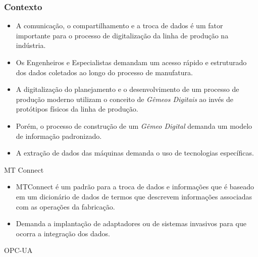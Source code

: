 \documentclass[aspectratio=169]{beamer}
\begin{document}
{\begin{frame}
\end{frame}


\begin{frame}
  \frametitle{Contexto}
  \begin{itemize}
    \item A comunicação, o compartilhamento e a troca de dados é um fator 
          importante para o processo de digitalização da linha de produção 
          na indústria.
    \item Os Engenheiros e Especialistas demandam um acesso r\'apido 
          e estruturado dos dados coletados ao longo do processo de 
          manufatura.
    \item A digitaliza\c c\~ao do planejamento e o desenvolvimento de um 
          processo de produ\c c\~ao moderno utilizam o conceito de 
          \emph{Gêmeos Digitais} ao inv\'es de prot\'otipos f\'isicos da 
          linha de produ\c c\~ao.
    \item Porém, o processo de constru\c c\~ao de um \emph{Gêmeo Digital} 
          demanda um modelo de informa\c c\~ao padronizado.
    \item A extra\c c\~ao de dados das m\'aquinas demanda o uso 
          de tecnologias espec\'ificas. 
  \end{itemize}  

\end{frame}


\begin{frame}{MT Connect}

  \begin{itemize}

    \item {
      MTConnect \'e um padr\~ao para a troca de dados e informa\c c\~oes 
      que \'e baseado em um dicion\'ario de dados de termos que descrevem 
      informa\c c\~oes associadas com as opera\c c\~oes da fabrica\c c\~ao.
    }

    \item {
      Demanda a implanta\c c\~ao de adaptadores ou de sistemas 
      invasivos para que ocorra a integra\c c\~ao dos dados.      
    }   

  \end{itemize}   

\end{frame}


\begin{frame}{OPC-UA}

  \begin{itemize}


\end{itemize}
\end{frame}}
\end{document}
